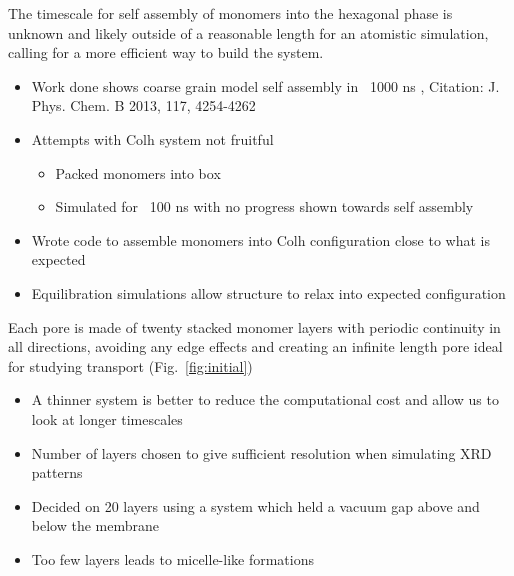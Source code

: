 \documentclass{article}
\begin{document}
	The timescale for self assembly of monomers into the hexagonal phase is unknown and likely outside of a reasonable length for an atomistic simulation, calling for a more efficient way to build the system. 
	\begin{itemize}
		\item Work done shows coarse grain model self assembly in ~1000 ns , Citation: J. Phys. Chem. B 2013, 117, 4254-4262
		\item Attempts with Colh system not fruitful  
		\begin{itemize}
			\item Packed monomers into box
			\item Simulated for ~100 ns with no progress shown towards self assembly
		\end{itemize}  
		\item Wrote code to assemble monomers into Colh configuration close to what is expected 
		\item Equilibration simulations allow structure to relax into expected configuration 
	\end{itemize}
	
	Each pore is made of twenty stacked monomer layers with periodic continuity in all directions, avoiding any edge effects and creating an infinite length pore ideal for studying transport (Fig.~\ref{fig:initial})
	\begin{itemize}
		\item A thinner system is better to reduce the computational cost and allow us to look at longer timescales
		\item Number of layers chosen to give sufficient resolution when simulating XRD patterns
                \item Decided on 20 layers using a system which held a vacuum gap above and below the membrane
                \item Too few layers leads to micelle-like formations
	\end{itemize}
\end{document}
